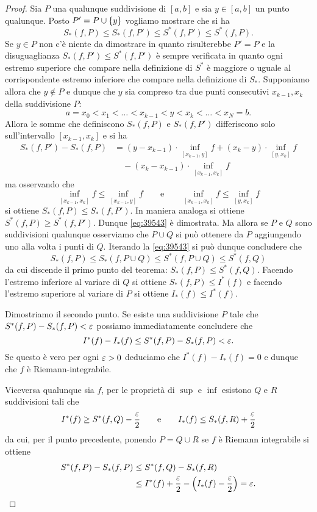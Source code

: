 \begin{proof}
Sia $P$ una qualunque suddivisione di $[a,b]$ e sia $y\in [a,b]$ un punto qualunque. Posto $P' = P \cup {\left\{ y \right\}}$ vogliamo mostrare
che si ha
\begin{equation}\label{eq:39543}
  S_*(f,P) \le S_*(f,P') \le S^*(f,P') \le S^*(f,P).
\end{equation}
Se $y\in P$ non c'è niente da dimostrare in quanto
risulterebbe $P'=P$ e la disuguaglianza $S_*(f,P') \le S^*(f,P')$ è sempre verificata in quanto ogni estremo superiore che compare nella definizione di $S^*$ è maggiore o uguale al corrispondente
estremo inferiore che compare nella definizione di $S_*$.
Supponiamo allora che $y \not \in P$ e dunque che $y$ sia compreso tra due punti consecutivi $x_{k-1}, x_k$ della suddivisione $P$:
\[
  a= x_0 < x_1 < \dots < x_{k-1} < y < x_k < \dots < x_N=b.
\]
Allora le somme che definiscono $S_*(f,P)$ e $S_*(f,P')$ differiscono solo sull'intervallo $[x_{k-1},x_k]$ e si ha
\begin{align*}
  S_*(f,P') - S_*(f,P)
  &= (y-x_{k-1})\cdot \!\!\inf_{[x_{k-1},y]}\!\!\! f
  + (x_k - y)\cdot\! \inf_{[y,x_k]}\! f\\
  &\quad - (x_k - x_{k-1})\cdot \!\!\inf_{[x_{k-1}, x_k]}\!\!\!f
\end{align*}
ma osservando che
\[
\inf_{[x_{k-1}, x_k]}\!\!f
\le\inf_{[x_{k-1},y]}\!\! f
\qquad \text{e} \qquad
\inf_{[x_{k-1}, x_k]}\!\!f
\le\inf_{[y,x_k]}\!\! f
\]
si ottiene $S_*(f,P) \le S_*(f,P')$.
In maniera analoga si ottiene $S^*(f,P) \ge S^*(f,P')$.
Dunque \eqref{eq:39543} è dimostrata.
Ma allora se $P$ e $Q$ sono suddivisioni qualunque osserviamo che $P\cup Q$ si può ottenere da $P$ aggiungendo uno alla volta i punti di $Q$. Iterando la \eqref{eq:39543} si può dunque concludere che
\[
 S_*(f,P) \le S_*(f,P\cup Q) \le S^*(f,P\cup Q) \le S^*(f,Q)
\]
da cui discende il primo punto del teorema: $S_*(f,P) \le S^*(f,Q)$.
Facendo l'estremo inferiore al variare di $Q$
si ottiene $S_*(f,P) \le I^*(f)$ e facendo l'estremo superiore al variare di $P$ si ottiene $I_*(f) \le I^*(f)$.

Dimostriamo il secondo punto.
Se esiste una suddivisione $P$ tale che $S^*(f,P)-S_*(f,P) < \varepsilon$ possiamo immediatamente concludere che
\[
I^*(f) - I_*(f) \le S^*(f,P) - S_*(f,P) < \varepsilon.
\]
Se questo è vero per ogni $\varepsilon >0$ deduciamo che $I^*(f) - I_*(f) = 0$ e dunque che $f$ è Riemann-integrabile.

Viceversa qualunque sia $f$, per le proprietà
di $\sup$ e $\inf$
esistono $Q$ e $R$ suddivisioni tali che
\[
  I^*(f) \ge S^*(f,Q) - \frac{\varepsilon} 2
  \qquad\text{e}\qquad
  I_*(f) \le S_*(f,R) + \frac{\varepsilon} 2
\]
da cui, per il punto precedente, ponendo $P=Q\cup R$
se $f$ è Riemann integrabile
si ottiene
\begin{align*}
S^*(f,P)-S_*(f,P) &\le S^*(f,Q) - S_*(f,R) \\
&\le I^*(f) + \frac{\varepsilon} 2 - {\left( I_*(f) - \frac {\varepsilon} 2 \right)} = \varepsilon.
\end{align*}


\end{proof}
